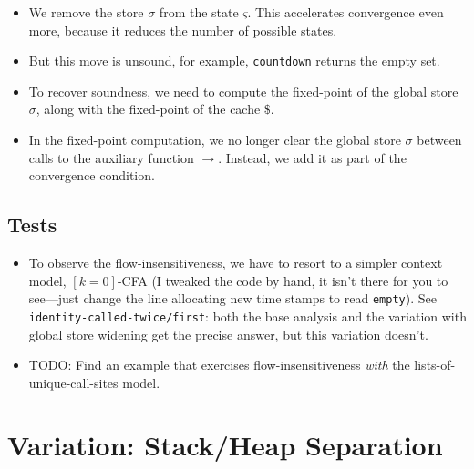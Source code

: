 \documentclass[12pt, oneside]{book}
\begin{document}
\begin{itemize}
  \item We remove the store \(σ\) from the state \(ς\). This accelerates convergence even more, because it reduces the number of possible states.
  \item But this move is unsound, for example, \texttt{countdown} returns the empty set.
  \item To recover soundness, we need to compute the fixed-point of the global store \(σ\), along with the fixed-point of the cache \(\$\).
  \item In the fixed-point computation, we no longer clear the global store \(σ\) between calls to the auxiliary function \(→\). Instead, we add it as part of the convergence condition.
\end{itemize}

\subsection{Tests}

\begin{itemize}
  \item To observe the flow-insensitiveness, we have to resort to a simpler context model, \([k=0]\)-CFA (I tweaked the code by hand, it isn’t there for you to see—just change the line allocating new time stamps to read \texttt{empty}). See \texttt{identity-called-twice/first}: both the base analysis and the variation with global store widening get the precise answer, but this variation doesn’t.
  \item TODO: Find an example that exercises flow-insensitiveness \emph{with} the lists-of-unique-call-sites model.
\end{itemize}

\section{Variation: Stack/Heap Separation}
\label{section:variation--stack-heap-separation}
\end{document}
